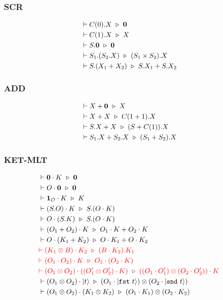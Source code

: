 \subsubsection*{\textsf{SCR}}
\begin{align*}
  & \vdash C(0).X \ \triangleright\  \mathbf{0}\\
  & \vdash C(1).X \ \triangleright\  X \\
  & \vdash S.\mathbf{0} \ \triangleright\  \mathbf{0} \\
  & \vdash S_1.(S_2.X) \ \triangleright\  (S_1 \times S_2).X \\
  & \vdash S.(X_1 + X_2) \ \triangleright\  S.X_1 + S.X_2
\end{align*}

\subsubsection*{\textsf{ADD}}
\begin{align*}
  & \vdash X + \mathbf{0} \ \triangleright\  X \\
  & \vdash X + X \ \triangleright\  C(1 + 1).X \\
  & \vdash S.X + X \ \triangleright\  (S + C(1)).X \\
  & \vdash S_1.X + S_2.X \ \triangleright\  (S_1 + S_2).X
\end{align*}

\subsubsection*{\textsf{KET-MLT}}
\begin{align*}
  & \vdash \textbf{0} \cdot K \ \triangleright\  \textbf{0} \\
  & \vdash O \cdot \mathbf{0} \ \triangleright\  \mathbf{0} \\
  & \vdash \textbf{1}_\mathcal{O} \cdot K \ \triangleright\  K \\
  & \vdash (S.O) \cdot K \ \triangleright\  S.(O \cdot K) \\
  & \vdash O \cdot (S.K) \ \triangleright\  S.(O \cdot K) \\
  & \vdash (O_1 + O_2) \cdot K \ \triangleright\  O_1 \cdot K + O_2 \cdot K \\
  & \vdash O \cdot (K_1 + K_2) \ \triangleright\  O \cdot K_1 + O \cdot K_2 \\
  & \textcolor{red}{\vdash (K_1 \otimes B) \cdot K_2 \ \triangleright\  (B \cdot K_2).K_1} \\
  & \textcolor{red}{\vdash (O_1 \cdot O_2) \cdot K \ \triangleright\  O_1 \cdot (O_2 \cdot K)} \\
  & \textcolor{red}{\vdash (O_1 \otimes O_2) \cdot ((O_1' \otimes O_2') \cdot K) \ \triangleright\  ((O_1 \cdot O_1') \otimes (O_2 \cdot O_2')) \cdot K} \\
  & \vdash (O_1 \otimes O_2) \cdot |t\rangle \ \triangleright\  (O_1 \cdot |\texttt{fst}\ t\rangle) \otimes (O_2 \cdot |\texttt{snd}\ t\rangle) \\
  & \vdash (O_1 \otimes O_2) \cdot (K_1 \otimes K_2) \ \triangleright\  (O_1 \cdot K_1) \otimes (O_2 \cdot K_2)
\end{align*}


